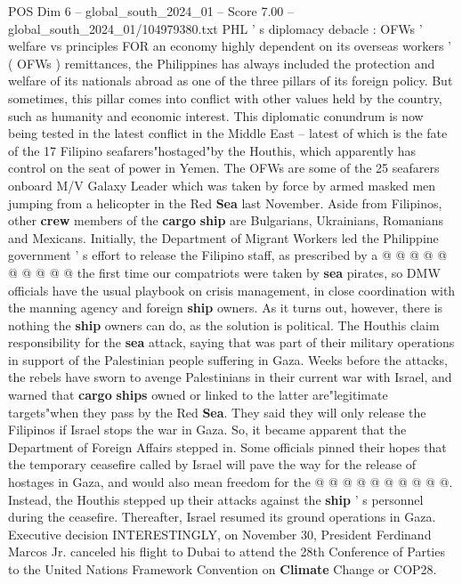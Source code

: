 \begin{textsample}{POS Dim 6 – global\_south\_2024\_01 – Score 7.00 – global\_south\_2024\_01/104979380.txt}  \label{ex:f6_pos_085}
PHL ' s diplomacy debacle : OFWs ' welfare vs principles FOR an economy highly dependent on its overseas workers ' ( OFWs ) remittances, the Philippines has always included the protection and welfare of its nationals abroad as one of the three pillars of its foreign policy.
But sometimes, this pillar comes into conflict with other values held by the country, such as humanity and economic interest.
This diplomatic conundrum is now being tested in the latest conflict in the Middle East -- latest of which is the fate of the 17 Filipino seafarers"hostaged"by the Houthis, which apparently has control on the seat of power in Yemen.
The OFWs are some of the 25 seafarers onboard M/V Galaxy Leader which was taken by force by armed masked men jumping from a helicopter in the Red \textbf{Sea} last November.
Aside from Filipinos, other \textbf{crew} members of the \textbf{cargo} \textbf{ship} are Bulgarians, Ukrainians, Romanians and Mexicans.
Initially, the Department of Migrant Workers led the Philippine government ' s effort to release the Filipino staff, as prescribed by a @ @ @ @ @ @ @ @ @ @ the first time our compatriots were taken by \textbf{sea} pirates, so DMW officials have the usual playbook on crisis management, in close coordination with the manning agency and foreign \textbf{ship} owners.
As it turns out, however, there is nothing the \textbf{ship} owners can do, as the solution is political.
The Houthis claim responsibility for the \textbf{sea} attack, saying that was part of their military operations in support of the Palestinian people suffering in Gaza.
Weeks before the attacks, the rebels have sworn to avenge Palestinians in their current war with Israel, and warned that \textbf{cargo} \textbf{ships} owned or linked to the latter are"legitimate targets"when they pass by the Red \textbf{Sea}.
They said they will only release the Filipinos if Israel stops the war in Gaza.
So, it became apparent that the Department of Foreign Affairs stepped in.
Some officials pinned their hopes that the temporary ceasefire called by Israel will pave the way for the release of hostages in Gaza, and would also mean freedom for the @ @ @ @ @ @ @ @ @ @.
Instead, the Houthis stepped up their attacks against the \textbf{ship} ' s personnel during the ceasefire.
Thereafter, Israel resumed its ground operations in Gaza.
Executive decision INTERESTINGLY, on November 30, President Ferdinand Marcos Jr. canceled his flight to Dubai to attend the 28th Conference of Parties to the United Nations Framework Convention on \textbf{Climate} Change or COP28.

\end{textsample}
